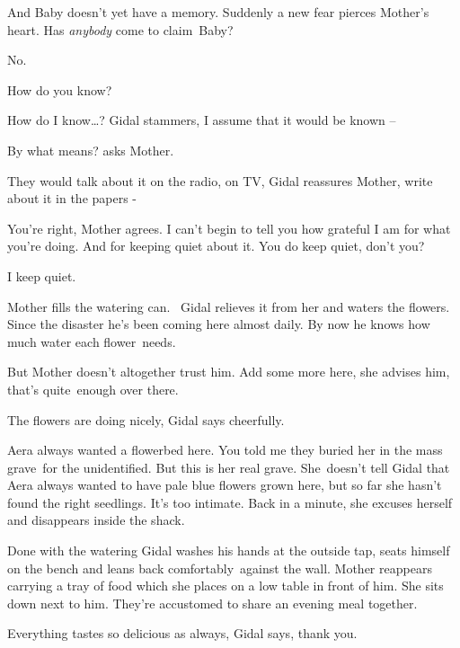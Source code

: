 \documentclass[letterpaper]{article}
\begin{document}
{\textquotedbl}And Baby doesn't yet have a memory.{\textquotedbl} Suddenly a new fear pierces Mother's heart.
{\textquotedbl}Has \textit{anybody }come to claim~Baby?{\textquotedbl} 

{\textquotedbl}No.{\textquotedbl} 

{\textquotedbl}How do you know?{\textquotedbl}

{\textquotedbl}How do I know{\dots}?{\textquotedbl} Gidal stammers, {\textquotedbl}I assume that it would be known
--{\textquotedbl} 

{\textquotedbl}By what means?{\textquotedbl} asks Mother.

{\textquotedbl}They would talk about it on the radio, on TV,{\textquotedbl} Gidal reassures Mother, {\textquotedbl}write
 about it in the papers -{\textquotedbl} 

{\textquotedbl}You're right,{\textquotedbl} Mother agrees. {\textquotedbl}I can't begin to tell you how grateful I am
for what you're doing. And for keeping quiet about it. You do keep quiet, don't you?{\textquotedbl} 

{\textquotedbl}I keep quiet.{\textquotedbl}

Mother fills the watering can. ~Gidal relieves it from her and waters the flowers. Since the disaster he's been coming
here almost daily. By now he knows how much water each flower\ needs. 

But Mother doesn't altogether trust him. {\textquotedbl}Add some more here,{\textquotedbl} she advises him,
{\textquotedbl}that's quite~enough over there.{\textquotedbl} 

{\textquotedbl}The flowers are doing nicely,{\textquotedbl} Gidal says cheerfully.

{\textquotedbl}Aera always wanted a flowerbed here. You told me they buried her in the mass grave~for the unidentified.
But this is her real grave.{\textquotedbl} She~doesn't tell Gidal that Aera always wanted to have pale blue flowers
grown here, but so far she hasn't found the right seedlings. It's too intimate. {\textquotedbl}Back in a
minute,{\textquotedbl} she excuses herself and disappears inside the shack.

Done with the watering Gidal washes his hands at the outside tap, seats himself on the bench and leans back
comfortably~against the wall. Mother reappears carrying a tray of food which she places on a low table in front of him.
She sits down next to him. They're accustomed to share an evening meal together.\ 

{\textquotedbl}Everything tastes so delicious as always,{\textquotedbl} Gidal says, {\textquotedbl}thank
you.{\textquotedbl} 
\end{document}
